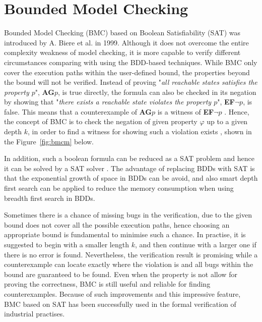 \section{Bounded Model Checking} \label{sec:bmc}
Bounded Model Checking (BMC) based on Boolean Satisfiability (SAT) was introduced by A. Biere et al. in 1999\cite{biere2003bounded}. Although it does not overcome the entire complexity weakness of model checking, it is more capable to verify different circumstances comparing with using the BDD-based techniques. While BMC only cover the execution paths within the user-defined bound, the properties beyond the bound will not be verified. Instead of proving "\textit{all reachable states satisfies the property $p$}", \textbf{AG}$p$, is true directly, the formula can also be checked in its negation by showing that "\textit{there exists a reachable state violates the property $p$}", \textbf{EF}$\neg p$, is false. This means that a counterexample of \textbf{AG}$p$ is a witness of \textbf{EF}$\neg p$ \cite{Clarke:2001:BMC:510986.510987}. Hence, the concept of BMC is to check the negation of given property $\varphi$ up to a given depth $k$, in order to find a witness for showing such a violation exists \cite{7423219}, shown in the Figure~\ref{fig:bmcm} below. 




In addition, such a boolean formula can be reduced as a SAT problem and hence it can be solved by a SAT solver \cite{biere2003bounded, 1_sagiv_2015}. The advantage of replacing BDDs with SAT is that the exponential growth of space in BDDs can be avoid, and also smart depth first search can be applied to reduce the memory consumption when using breadth first search in BDDs. 

Sometimes there is a chance of missing bugs in the verification, due to the given bound does not cover all the possible execution paths, hence choosing an appropriate bound is fundamental to minimise such a chance. In practise, it is suggested to begin with a smaller length $k$, and then continue with a larger one if there is no error is found. Nevertheless, the verification result is promising while a counterexample can locate exactly where the violation is and all bugs within the bound are guaranteed to be found. Even when the property is not allow for proving the correctness, BMC is still useful and reliable for finding counterexamples. Because of such improvements and this impressive feature, BMC based on SAT has been successfully used in the formal verification of industrial practises. 

